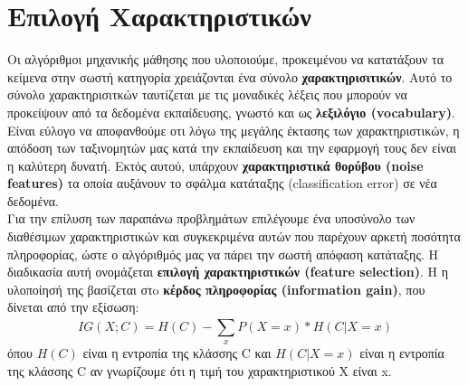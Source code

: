 \documentclass[12pt]{article}
\begin{document}
\section{Επιλογή Χαρακτηριστικών}
Οι αλγόριθμοι μηχανικής μάθησης που υλοποιούμε, προκειμένου να κατατάξουν τα κείμενα στην σωστή κατηγορία χρειάζονται ένα σύνολο \textbf{χαρακτηρισιτικών}. Αυτό το σύνολο χαρακτηρισιτκών ταυτίζεται με τις μοναδικές λέξεις που μπορούν να προκείψουν από τα δεδομένα εκπαίδευσης, γνωστό και ως \textbf{λεξιλόγιο (vocabulary)}.\\
Είναι εύλογο να αποφανθούμε οτι λόγω της μεγάλης έκτασης των χαρακτηριστικών, η απόδοση των ταξινομητών μας κατά την εκπαίδευση και την εφαρμογή τους δεν είναι η καλύτερη δυνατή. Εκτός αυτού, υπάρχουν \textbf{χαρακτηριστικά θορύβου (noise features)} τα οποία αυξάνουν το σφάλμα κατάταξης (classification error) σε νέα δεδομένα.\\
Για την επίλυση των παραπάνω προβλημάτων επιλέγουμε ένα υποσύνολο των διαθέσιμων χαρακτηριστικών και συγκεκριμένα αυτών που παρέχουν αρκετή ποσότητα πληροφορίας, ώστε ο αλγόριθμός μας να πάρει την σωστή απόφαση κατάταξης. Η διαδικασία αυτή ονομάζεται \textbf{επιλογή χαρακτηριστικών (feature selection)}. Η η υλοποίησή της βασίζεται στo \textbf{κέρδος πληροφορίας (information gain)}, που δίνεται από την εξίσωση:
\begin{equation*}
    IG(X;C) = H(C) - \sum_{x}^{}P(X=x)*H(C|X=x)
\end{equation*}
όπου $Η(C)$ είναι η εντροπία της κλάσσης C και $H(C|X=x)$ είναι η εντροπία της κλάσσης C αν γνωρίζουμε ότι η τιμή του χαρακτηριστικού Χ είναι x.

\end{document}
